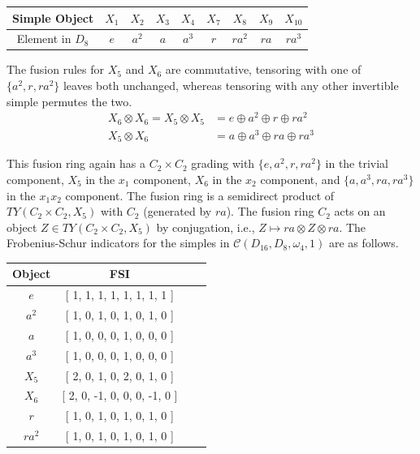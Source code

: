 \documentclass[a4paper, 10pt]{book}
\theoremstyle{definition}
\numberwithin{equation}{chapter}
\newcommand\ot{\otimes}
\newcommand\C{\mathcal C}
\begin{document}
\begin{enumerate}
\begin{center}
\begin{tabular}{ | c |c |c |c |c |c |c| c| c|}
\hline
Simple Object & $X_1$& $X_2$ & $X_3$  & $X_4$ & $X_7$ & $X_8$ & $X_9$ & $X_{10}$    \\ 
\hline
Element in $D_8$ & $e$& $a^2$ & $a$ & $a^3$ & $r$ & $ra^2$ & $ra$ & $ra^3$\\
\hline
\end{tabular}
\end{center}
The fusion rules for $X_5$ and $X_6$ are commutative, tensoring with one of $\{a^2, r, ra^2\}$ leaves both unchanged, whereas tensoring with any other invertible simple permutes the two.
\begin{align*}
X_6\ot X_6 = X_5\ot X_5 &= e\oplus a^2 \oplus r \oplus ra^2\\
X_5\ot X_6 &= a \oplus a^3 \oplus ra \oplus ra^3
\end{align*}

This fusion ring again has a $C_2\times C_2$ grading with $\{e, a^2, r, ra^2\}$ in the trivial component, $X_5$ in the $x_1$ component, $X_6$ in the $x_2$ component, and $\{a, a^3, ra, ra^3\}$ in the $x_1x_2$ component. The fusion ring is a semidirect product of $TY(C_2\times C_2, X_5)$ with $C_2$ (generated by $ra$). The fusion ring $C_2$ acts on an object $Z\in TY(C_2\times C_2, X_5)$ by conjugation, i.e., $Z\mapsto ra\ot Z\ot ra$.
The Frobenius-Schur indicators for the simples in $\C(D_{16}, D_8, \omega_4, 1)$ are as follows.
\begin{center}
\begin{tabular}{ | c |c | c | r |}
\hline
Object & FSI\\
\hline
$e$ &[ 1, 1, 1, 1, 1, 1, 1, 1 ]\\
\hline
 $a^2$&[ 1, 0, 1, 0, 1, 0, 1, 0 ]\\
\hline
 $a$& [ 1, 0, 0, 0, 1, 0, 0, 0 ]\\
  \hline
   
 $a^3$ &[ 1, 0, 0, 0, 1, 0, 0, 0 ]\\
  \hline
$X_5$&  [ 2, 0, 1, 0, 2, 0, 1, 0 ]\\
  \hline
$ X_6 $&  [ 2, 0, -1, 0, 0, 0, -1, 0 ]\\
  \hline
 $r$& [ 1, 0, 1, 0, 1, 0, 1, 0 ]\\
  \hline
 $ra^2$ & [ 1, 0, 1, 0, 1, 0, 1, 0 ]\\
  \hline
  

\end{tabular}
\end{center}
\end{enumerate}
\end{document}
